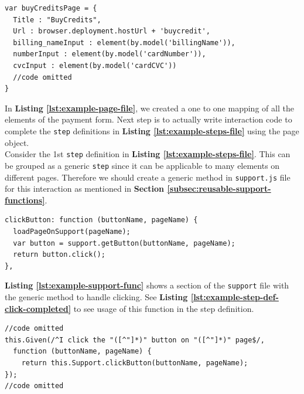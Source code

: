 \begin{listing}[H]
\begin{verbatim}
var buyCreditsPage = {
  Title : "BuyCredits",
  Url : browser.deployment.hostUrl + 'buycredit',
  billing_nameInput : element(by.model('billingName')),
  numberInput : element(by.model('cardNumber')),
  cvcInput : element(by.model('cardCVC'))
  //code omitted
}
\end{verbatim}
\label{lst:example-page-file}
\end{listing}

In \textbf{Listing \ref{lst:example-page-file}}, we created a one to one mapping of all the elements of the payment form. Next step is to actually write interaction code to complete the \texttt{step} definitions in \textbf{Listing \ref{lst:example-steps-file}} using the page object.\\

Consider the 1st \texttt{step} definition in \textbf{Listing \ref{lst:example-steps-file}}. This can be grouped as a generic \texttt{step} since it can be applicable to many elements on different pages. Therefore we should create a generic method in \texttt{support.js} file for this interaction as mentioned in  \textbf{Section \ref{subsec:reusable-support-functions}}.

\begin{listing}[H]
\begin{verbatim}
clickButton: function (buttonName, pageName) {
  loadPageOnSupport(pageName);
  var button = support.getButton(buttonName, pageName);
  return button.click();
},
\end{verbatim}
\label{lst:example-support-func}
\end{listing}

\textbf{Listing \ref{lst:example-support-func}} shows a section of the \texttt{support} file with the generic method to handle clicking. See \textbf{Listing \ref{lst:example-step-def-click-completed}} to see usage of this function in the step definition.

\begin{listing}[H]
\begin{verbatim}
//code omitted
this.Given(/^I click the "([^"]*)" button on "([^"]*)" page$/,
  function (buttonName, pageName) {
    return this.Support.clickButton(buttonName, pageName);
});
//code omitted
\end{verbatim}
\label{lst:example-step-def-click-completed}
\end{listing}

